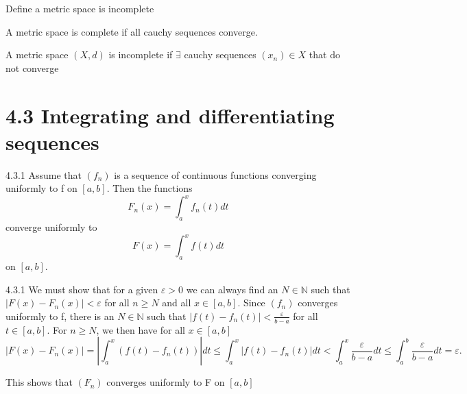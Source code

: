 \documentclass[a4paper,norsk]{article}
\renewcommand{\geq}{\geqslant}
\renewcommand{\leq}{\leqslant}
\renewcommand{\epsilon}{\varepsilon}
\begin{document}
\begin{oppgavebox}{Define a metric space is incomplete}{}
\begin{proofbox}{}{}
  A metric space is complete if all cauchy sequences converge. 

  A metric space $ \left( X, d \right)  $  is incomplete if $ \exists  $ cauchy sequences $ \left( x_n \right) \in X  $  that do not converge
\end{proofbox}
\end{oppgavebox}


\section*{4.3 Integrating and differentiating sequences}


\begin{propositionbox}{4.3.1}{}
Assume that $ \left( f_n \right)  $ is a sequence of continuous functions converging uniformly to f on $ \left[ a, b \right]  $. Then the functions 
\[
    F_n(x) = \int_{a}^{x} f_n(t) dt 
\]
converge uniformly to
\[
    F(x) = \int_{a}^{x} f(t) dt 
\]
on $ \left[ a, b \right]  $.


\begin{proofbox}{4.3.1}{}
  We must show that for a given $ \epsilon  > 0 $ we can always find an $ N \in \mathbb{N} $  such that $ \left| F(x) - F_n(x) \right| < \epsilon  $ for all $ n \geq  N $  and all $ x \in \left[ a, b \right]  $. Since $ \left( f_n \right)  $    converges uniformly to f, there is an $ N \in \mathbb{N} $ such that $ \left| f(t) - f_n(t) \right| < \frac{ \epsilon   }{ b-a } $ for all $ t \in \left[ a, b \right]  $. For $ n \geq N $, we then have for all $ x \in  \left[ a, b \right]  $ 
  \[
      \left| F(x) - F_n(x) \right| = \left| \int_{a}^{x} \left( f(t) - f_n(t) \right)   \right|  dt \leq  \int_{a}^{x} \left| f(t) - f_n(t) \right| dt <  \int_{a}^{x} \frac{ \epsilon   }{ b-a } dt \leq \int_{a}^{b} \frac{ \epsilon   }{ b-a } dt = \epsilon.  
  \]

  This shows that $ \left( F_n \right)  $ converges uniformly to F on $ \left[ a, b \right]  $  
      
\end{proofbox}
\end{propositionbox}
\end{document}
